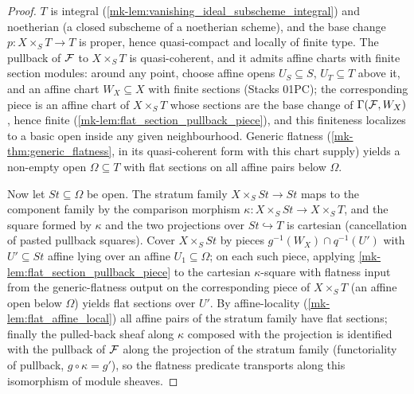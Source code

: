 \begin{proof}
  \leanok
  \(T\) is integral (\ref{mk-lem:vanishing_ideal_subscheme_integral}) and
  noetherian (a closed subscheme of a noetherian scheme), and the base
  change \(p : X \times_S T \to T\) is proper, hence quasi-compact and
  locally of finite type.  The pullback of \(\mathcal{F}\) to \(X \times_S T\) is
  quasi-coherent, and it admits affine charts with finite section modules:
  around any point, choose affine opens \(U_S \subseteq S\),
  \(U_T \subseteq T\) above it, and an affine chart \(W_X \subseteq X\)
  with finite sections (Stacks 01PC); the corresponding piece is an affine
  chart of \(X \times_S T\) whose sections are the base change of
  \(\Gamma(\mathcal{F}, W_X)\), hence finite (\ref{mk-lem:flat_section_pullback_piece}),
  and this finiteness localizes to a basic open inside any given
  neighbourhood.  Generic flatness (\ref{mk-thm:generic_flatness}, in its
  quasi-coherent form with this chart supply) yields a non-empty open
  \(\Omega \subseteq T\) with flat sections on all affine pairs below
  \(\Omega\).

  Now let \(\mathit{St} \subseteq \Omega\) be open.  The stratum family
  \(X \times_S \mathit{St} \to \mathit{St}\) maps to the component family by
  the comparison morphism
  \(\kappa : X \times_S \mathit{St} \to X \times_S T\), and the square
  formed by \(\kappa\) and the two projections over
  \(\mathit{St} \hookrightarrow T\) is cartesian (cancellation of pasted
  pullback squares).  Cover \(X \times_S \mathit{St}\) by pieces
  \(g^{-1}(W_X) \cap q^{-1}(U')\) with \(U' \subseteq \mathit{St}\) affine
  lying over an affine \(U_1 \subseteq \Omega\); on each such piece,
  applying \ref{mk-lem:flat_section_pullback_piece} to the cartesian
  \(\kappa\)-square with flatness input from the generic-flatness output on
  the corresponding piece of \(X \times_S T\) (an affine open below
  \(\Omega\)) yields flat sections over \(U'\).  By affine-locality
  (\ref{mk-lem:flat_affine_local}) all affine pairs of the stratum family
  have flat sections; finally the pulled-back sheaf along \(\kappa\)
  composed with the projection is identified with the pullback of \(\mathcal{F}\)
  along the projection of the stratum family (functoriality of pullback,
  \(g \circ \kappa = g'\)), so the flatness predicate transports along this
  isomorphism of module sheaves.
\end{proof}

